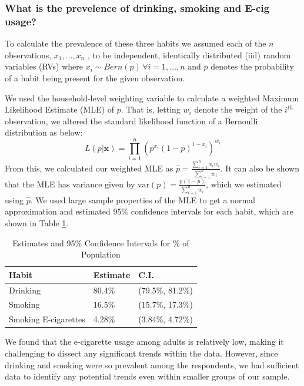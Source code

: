 \documentclass[
  11pt,
  twocolumn]{article}
\begin{document}
\hypertarget{what-is-the-prevelence-of-drinking-smoking-and-e-cig-usage}{%
\subsubsection{What is the prevelence of drinking, smoking and E-cig
usage?}\label{what-is-the-prevelence-of-drinking-smoking-and-e-cig-usage}}

To calculate the prevalence of these three habits we assumed each of the
\(n\) observations, \(x_1,…,x_n\) , to be independent, identically
distributed (iid) random variables (RVs) where
\(x_i \sim Bern(p)\, \forall i=1,…,n\) and \(p\) denotes the probability
of a habit being present for the given observation.

We used the household-level weighting variable to calculate a weighted
Maximum Likelihood Estimate (MLE) of \(p\). That is, letting \(w_i\)
denote the weight of the \(i^{th}\) observation, we altered the standard
likelihood function of a Bernoulli distribution as below:
\[L(p|\textbf{x}) = \prod_{i = 1}^{n} (p^{x_i}(1-p)^{1-x_i})^{w_i}\]
From this, we calculated our weighted MLE as
\(\widehat{p} = \frac{\sum_{i=1}^{n} x_iw_i}{\sum_{i=1}^{n} w_i}\). It
can also be shown that the MLE has variance given by
\(\text{var}(p)=\frac{p(1-p)}{\sum_{i=1}^{n}w_i}\), which we estimated
using \(\widehat{p}\). We used large sample properties of the MLE to get
a normal approximation and estimated 95\% confidence intervals for each
habit, which are shown in Table \ref{tab:output-estimates-table}.

\begin{table}

\caption{\label{tab:outputestimatestable}Estimates and 95\% Confidence Intervals for \% of Population\label{tab:output-estimates-table}}
\centering
\fontsize{9}{11}\selectfont
\begin{tabular}[t]{l|l|l}
\hline
\textbf{Habit} & \textbf{Estimate} & \textbf{C.I.}\\
\hline
Drinking & 80.4\% & (79.5\%, 81.2\%)\\
\hline
Smoking & 16.5\% & (15.7\%, 17.3\%)\\
\hline
Smoking E-cigarettes & 4.28\% & (3.84\%, 4.72\%)\\
\hline
\end{tabular}
\end{table}

We found that the e-cigarette usage among adults is relatively low,
making it challenging to dissect any significant trends within the data.
However, since drinking and smoking were so prevalent among the
respondents, we had sufficient data to identify any potential trends
even within smaller groups of our sample.
\end{document}
